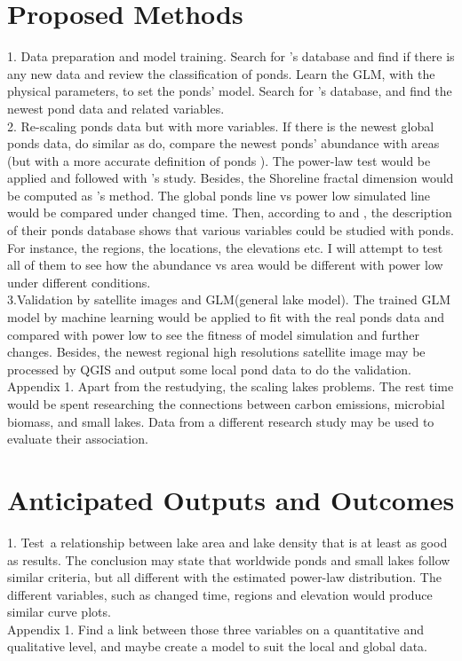 \section{Proposed Methods}

1. Data preparation and model training. Search for \cite{cael2016size}'s database and find if there is any new data and review the classification of ponds. Learn the GLM, with the physical parameters, to set the ponds' model. Search for \cite{richardson2022functional}'s database, and find the newest pond data and related variables.\\
2. Re-scaling ponds data but with more variables. If there is the newest global ponds data, do similar as \cite{cael2016size} do, compare the newest ponds' abundance with areas (but with a more accurate definition of ponds \citep{richardson2022functional}). The power-law test would be applied and followed with \cite{downing2009global}'s study. Besides, the Shoreline fractal dimension would be computed as \cite{cael2016size}'s method. The global ponds line vs power low simulated line would be compared under changed time. Then, according to \cite{verpoorter2014global} and \cite{richardson2022functional}, the description of their ponds database shows that various variables could be studied with ponds. For instance, the regions, the locations, the elevations etc. I will attempt to test all of them to see how the abundance vs area would be different with power low under different conditions.\\
3.Validation by satellite images and GLM(general lake model). The trained GLM model by machine learning would be applied to fit with the real ponds data and compared with power low to see the fitness of model simulation and further changes. Besides, the newest regional high resolutions satellite image may be processed by QGIS and output some local pond data to do the validation.
\\
Appendix 1. Apart from the restudying, the scaling lakes problems. The rest time would be spent researching the connections between carbon emissions, microbial biomass, and small lakes. Data from a different research study may be used to evaluate their association.


\section{Anticipated Outputs and Outcomes}
1. Test a relationship between lake area and lake density that is at least as good as \cite{cael2016size} results. The conclusion may state that worldwide ponds and small lakes follow similar criteria, but all different with the estimated power-law distribution. The different variables, such as changed time, regions and elevation would produce similar curve plots.
\\
Appendix 1. Find a link between those three variables on a quantitative and qualitative level, and maybe create a model to suit the local and global data.


